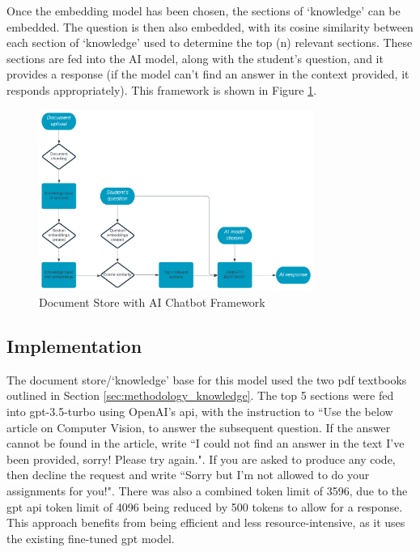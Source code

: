 Once the embedding model has been chosen, the sections of `knowledge' can be embedded. The question is then also embedded, with its cosine similarity between each section of `knowledge' used to determine the top (n) relevant sections. These sections are fed into the AI model, along with the student's question, and it provides a response (if the model can't find an answer in the context provided, it responds appropriately). This framework is shown in Figure \ref{fig:initial_framework}.

\begin{figure}[h!]
    \centering
    \includegraphics[width=0.8\textwidth]{images/framework.png}
    \caption{Document Store with AI Chatbot Framework}
    \label{fig:initial_framework}
\end{figure}

\subsection{Implementation}
The document store/`knowledge' base for this model used the two \acrshort{pdf} textbooks outlined in Section \ref{sec:methodology_knowledge}. The top 5 sections were fed into gpt-3.5-turbo using OpenAI's \acrshort{api}, with the instruction to ``Use the below article on Computer Vision, to answer the subsequent question. If the answer cannot be found in the article, write ``I could not find an answer in the text I've been provided, sorry! Please try again.". If you are asked to produce any code, then decline the request and write ``Sorry but I'm not allowed to do your assignments for you!". There was also a combined token limit of 3596, due to the \acrshort{gpt} \acrshort{api} token limit of 4096 being reduced by 500 tokens to allow for a response. This approach benefits from being efficient and less resource-intensive, as it uses the existing fine-tuned \acrshort{gpt} model.

